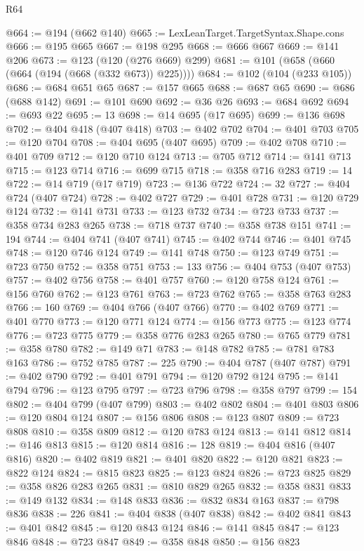\begin{lexlean}{R64}
\begin{coremodule}
@664 := @194 (@662 @140)
@665 := LexLeanTarget.TargetSyntax.Shape.cons
@666 := @195 @665
@667 := @198 @295
@668 := @666 @667
@669 := @141 @206
@673 := @123 (@120 (@276 @669) @299)
@681 := @101 (@658 (@660 (@664 (@194 (@668 (@332 @673)) @225))))
@684 := @102 (@104 (@233 @105))
@686 := @684 @651 @65
@687 := @157 @665
@688 := @687 @65
@690 := @686 (@688 @142)
@691 := @101 @690
@692 := @36 @26
@693 := @684 @692
@694 := @693 @22
@695 := 13
@698 := @14 @695 (@17 @695)
@699 := @136 @698
@702 := @404 @418 (@407 @418)
@703 := @402 @702
@704 := @401 @703
@705 := @120 @704
@708 := @404 @695 (@407 @695)
@709 := @402 @708
@710 := @401 @709
@712 := @120 @710 @124
@713 := @705 @712
@714 := @141 @713
@715 := @123 @714
@716 := @699 @715
@718 := @358 @716 @283
@719 := 14
@722 := @14 @719 (@17 @719)
@723 := @136 @722
@724 := 32
@727 := @404 @724 (@407 @724)
@728 := @402 @727
@729 := @401 @728
@731 := @120 @729 @124
@732 := @141 @731
@733 := @123 @732
@734 := @723 @733
@737 := @358 @734 @283 @265
@738 := @718 @737
@740 := @358 @738 @151
@741 := 194
@744 := @404 @741 (@407 @741)
@745 := @402 @744
@746 := @401 @745
@748 := @120 @746 @124
@749 := @141 @748
@750 := @123 @749
@751 := @723 @750
@752 := @358 @751
@753 := 133
@756 := @404 @753 (@407 @753)
@757 := @402 @756
@758 := @401 @757
@760 := @120 @758 @124
@761 := @156 @760
@762 := @123 @761
@763 := @723 @762
@765 := @358 @763 @283
@766 := 160
@769 := @404 @766 (@407 @766)
@770 := @402 @769
@771 := @401 @770
@773 := @120 @771 @124
@774 := @156 @773
@775 := @123 @774
@776 := @723 @775
@779 := @358 @776 @283 @265
@780 := @765 @779
@781 := @358 @780
@782 := @149 @71
@783 := @148 @782
@785 := @781 @783 @163
@786 := @752 @785
@787 := 225
@790 := @404 @787 (@407 @787)
@791 := @402 @790
@792 := @401 @791
@794 := @120 @792 @124
@795 := @141 @794
@796 := @123 @795
@797 := @723 @796
@798 := @358 @797
@799 := 154
@802 := @404 @799 (@407 @799)
@803 := @402 @802
@804 := @401 @803
@806 := @120 @804 @124
@807 := @156 @806
@808 := @123 @807
@809 := @723 @808
@810 := @358 @809
@812 := @120 @783 @124
@813 := @141 @812
@814 := @146 @813
@815 := @120 @814
@816 := 128
@819 := @404 @816 (@407 @816)
@820 := @402 @819
@821 := @401 @820
@822 := @120 @821
@823 := @822 @124
@824 := @815 @823
@825 := @123 @824
@826 := @723 @825
@829 := @358 @826 @283 @265
@831 := @810 @829 @265
@832 := @358 @831
@833 := @149 @132
@834 := @148 @833
@836 := @832 @834 @163
@837 := @798 @836
@838 := 226
@841 := @404 @838 (@407 @838)
@842 := @402 @841
@843 := @401 @842
@845 := @120 @843 @124
@846 := @141 @845
@847 := @123 @846
@848 := @723 @847
@849 := @358 @848
@850 := @156 @823

\end{coremodule}
\end{lexlean}
